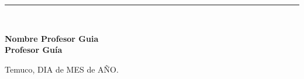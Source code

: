 \begin{titlepage}
{\begin{center}
\vspace*{0.5in}

\begin{flushright}
 \rule{65mm}{0.2mm}\\
\end{flushright}
\vspace*{-0.1in}
 \hspace*{3.5in} \textbf{Nombre Profesor Guia} \\
 \hspace*{3.5in} \textbf{Profesor Guía}

\vspace*{0.6in}

\begin{flushleft}
  Temuco, DIA de MES de AÑO.
\end{flushleft}

\end{center}
}
\end{titlepage}
